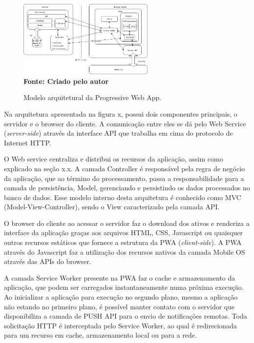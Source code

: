 \begin{figure}[ht]
	\centering	
	\caption[\hspace{0.1cm}]{Modelo arquitetural da Progressive Web App.}
	\vspace{-0.4cm}
	\includegraphics[width=0.6\textwidth]{figuras/arquitetura-pwa.png}
	 \vspace{-0.2cm}
	\\\textbf{\footnotesize Fonte: Criado pelo autor }
	\label{fig:casodeuso}
\end{figure}
\vspace{-0.5cm}

Na arquitetura apresentada na figura x, possui dois componentes principais, o servidor e o browser do cliente. A comunicação entre eles se dá pelo Web Service (\textit{server-side}) através da interface API que trabalha em cima do protocolo de Internet HTTP.

O Web service centraliza e distribui os recursos da aplicação, assim como explicado na seção x.x. A camada Controller é responsável pela regra de negócio da aplicação, que ao término do processamento, passa a responsabilidade para a camada de persistência, Model, gerenciando e persistindo os dados processados no banco de dados. Esse modelo interno desta arquitetura é conhecido como MVC (Model-View-Controller), sendo o View caracterizado pela camada API.

O browser do cliente ao acessar o servidor faz o download dos ativos e renderiza a interface da aplicação graças aos arquivos HTML,  CSS, Javascript ou quaisquer outros recursos estáticos que fornece a estrutura da PWA (\textit{client-side}). A PWA através do Javascript faz a utilização dos recursos nativos da camada Mobile OS através das APIs do browser.

A camada Service Worker presente na PWA faz o cache e armazenamento da aplicação, que podem ser carregados instantaneamente numa próxima execução. Ao inicializar a aplicação para execução no segundo plano, mesmo a aplicação não estando no primeiro plano, é possível manter contato com o servidor que disponibiliza a camada de PUSH API para o envio de notificações remotas. Toda solicitação HTTP é interceptada pelo Service Worker, ao qual é redirecionada para um recurso em cache, armazenamento local ou para a rede.

